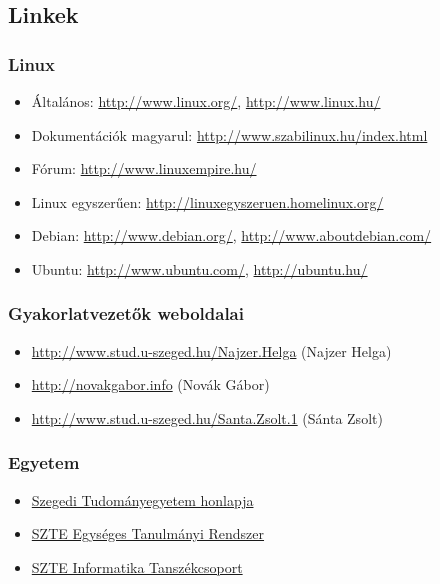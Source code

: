 \subsection*{Linkek}
\subsubsection*{Linux}
\begin{itemize}
\item Általános: \url{http://www.linux.org/}, \url{http://www.linux.hu/}
\item Dokumentációk magyarul: \url{http://www.szabilinux.hu/index.html}
\item Fórum: \url{http://www.linuxempire.hu/}
\item Linux egyszerűen: \url{http://linuxegyszeruen.homelinux.org/}
\item Debian:
			\url{http://www.debian.org/}, 
			\url{http://www.aboutdebian.com/}
\item Ubuntu: 
			\url{http://www.ubuntu.com/},
			\url{http://ubuntu.hu/}%
\end{itemize}

\subsubsection*{Gyakorlatvezetők weboldalai}
\begin{itemize}
\item \url{http://www.stud.u-szeged.hu/Najzer.Helga} (Najzer Helga)
\item \url{http://novakgabor.info} (Novák Gábor)
\item \url{http://www.stud.u-szeged.hu/Santa.Zsolt.1} (Sánta Zsolt)
\end{itemize}

\subsubsection*{Egyetem}
\begin{itemize}
\item \href{http://www.u-szeged.hu/}{Szegedi Tudományegyetem honlapja}
\item \href{https://www.etr.u-szeged.hu/}{SZTE Egységes Tanulmányi Rendszer}
\item \href{http://www.inf.u-szeged.hu}{SZTE Informatika Tanszékcsoport}
\end{itemize}

